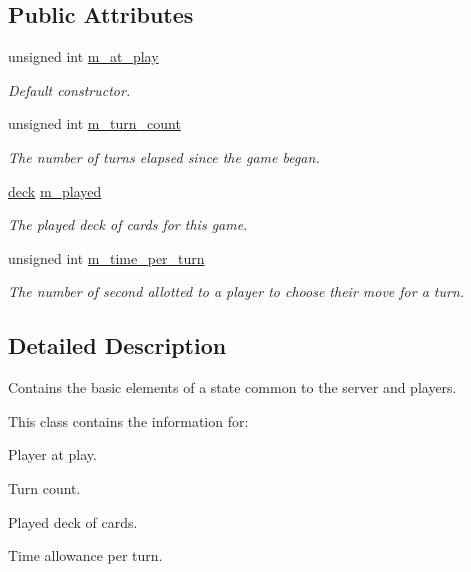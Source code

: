 \subsection*{\-Public \-Attributes}
\begin{DoxyCompactItemize}
\item 
unsigned int \hyperlink{class_uno___state_a7c0374eff2c4a4b3eed4b7eebb72a81a}{m\-\_\-at\-\_\-play}
\begin{DoxyCompactList}\small\item\em \-Default constructor. \end{DoxyCompactList}\item 
\hypertarget{class_uno___state_adba4113bb99a08f6804eeb348ed3822c}{
unsigned int \hyperlink{class_uno___state_adba4113bb99a08f6804eeb348ed3822c}{m\-\_\-turn\-\_\-count}}
\label{class_uno___state_adba4113bb99a08f6804eeb348ed3822c}

\begin{DoxyCompactList}\small\item\em \-The number of turns elapsed since the game began. \end{DoxyCompactList}\item 
\hyperlink{uno__deck_8h_ab634a15f4d19d3af113a71241b79c408}{deck} \hyperlink{class_uno___state_ad46fac2ea86f2fd2249675db49c35b6c}{m\-\_\-played}
\begin{DoxyCompactList}\small\item\em \-The played deck of cards for this game. \end{DoxyCompactList}\item 
\hypertarget{class_uno___state_a95a0eedf042c9c8cf261c3cf9e683f00}{
unsigned int \hyperlink{class_uno___state_a95a0eedf042c9c8cf261c3cf9e683f00}{m\-\_\-time\-\_\-per\-\_\-turn}}
\label{class_uno___state_a95a0eedf042c9c8cf261c3cf9e683f00}

\begin{DoxyCompactList}\small\item\em \-The number of second allotted to a player to choose their move for a turn. \end{DoxyCompactList}\end{DoxyCompactItemize}


\subsection{\-Detailed \-Description}
\-Contains the basic elements of a state common to the server and players. 

\-This class contains the information for\-: \begin{DoxyItemize}
\item \-Player at play. \item \-Turn count. \item \-Played deck of cards. \item \-Time allowance per turn. \end{DoxyItemize}


